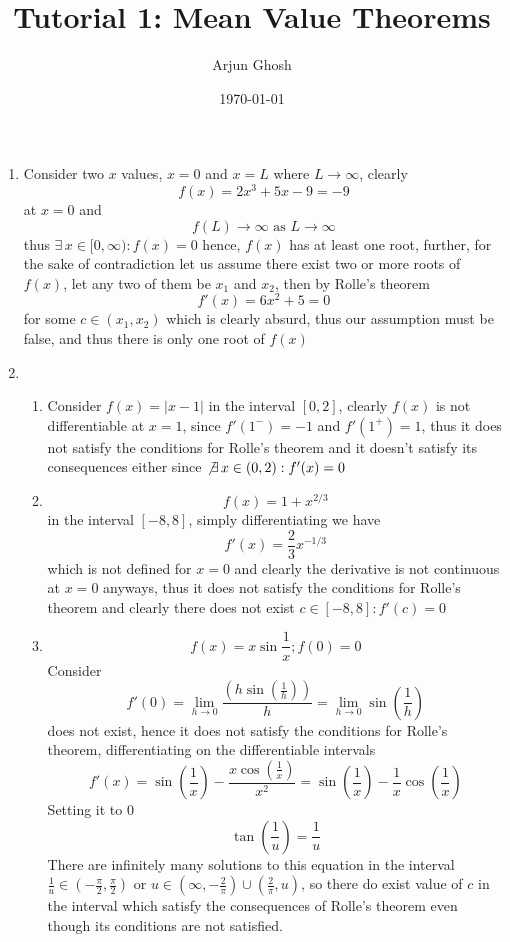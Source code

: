 \documentclass[12pt]{article}
\title{Tutorial 1: Mean Value Theorems}
\author{Arjun Ghosh}
\date{\today}
\begin{document}
\maketitle
\begin{enumerate}
	\item	
		Consider two $x$ values, $x=0$ and $x = L$ where $L \to \infty$, clearly
		$$
		f(x) = 2x^{3} + 5x -9  = -9
		$$ at $x=0$ and 
		$$
		f(L) \to \infty \text{ as } L \to \infty
		$$
		thus $\exists \,x \in [0,\infty) :f(x) = 0$ hence, $f(x)$ has at least one root, further, for the sake of contradiction let us assume there exist two or more roots of $f(x)$, let any two of them be $x_{1}$ and $x_{2}$, then by Rolle's theorem
		$$
		f'(x) = 6x^{2} + 5 = 0
		$$
		for some $c \in (x_{1}, x_{2})$ which is clearly absurd, thus our assumption must be false, and thus there is only one root of $f(x)$

	\item
		\begin{enumerate}

			\item
				Consider $f(x) = |x-1|$ in the interval $[0,2]$, clearly $f(x)$ is not differentiable at $x=1$, since $f'(1^{-}) = -1$ and $f'(1^{+})=1$, thus it does not satisfy the conditions for Rolle's theorem and it doesn't satisfy its consequences either since $\not\exists \, x \in (0,2) : f'(x) = 0$

			\item
				$$
				f(x) = 1 + x^{2/3}
				$$
				in the interval $[-8,8]$, simply differentiating we have
				$$
				f'(x) = \frac{2}{3}x^{-1/3}
				$$
				which is not defined for $x=0$ and clearly the derivative is not continuous at $x=0$ anyways, thus it does not satisfy the conditions for Rolle's theorem and clearly there does not exist $c \in[-8,8]: f'(c) = 0$

			\item
				$$
				f(x) = x \sin \frac{1}{x}; f(0) = 0
				$$
				Consider
				$$
				f'(0) = \lim_{ h \to 0 } \frac{\left( h\sin\left( \frac{1}{h} \right)  \right)}{h} = \lim_{  h \to 0 } \sin\left( \frac{1}{h} \right)
				$$
				does not exist, hence it does not satisfy the conditions for Rolle's theorem, differentiating on the differentiable intervals
				$$
				f'(x) = \sin\left( \frac{1}{x} \right) - \frac{x\cos\left( \frac{1}{x} \right)}{x^{2}} = \sin\left( \frac{1}{x} \right) -\frac{1}{x}\cos\left( \frac{1}{x} \right)
				$$
				Setting it to $0$
				$$
				\tan\left( \frac{1}{u} \right) = \frac{1}{u}
				$$
				There are infinitely many solutions to this equation in the interval $\frac{1}{u} \in\left( -\frac{\pi}{2}, \frac{\pi}{2} \right)$ or $u \in \left( \infty, -\frac{2}{\pi} \right) \cup\left( \frac{2}{\pi}, u \right)$, so there do exist value of $c$ in the interval which satisfy the consequences of Rolle's theorem even though its conditions are not satisfied.


\end{enumerate}
\end{enumerate}
\end{document}
